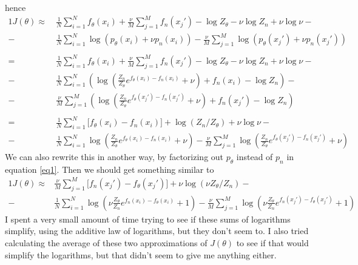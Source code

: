 \documentclass[a4paper]{article}
\begin{document}
hence
\begin{alignat*}{1}
J(\theta) \approx \ &\frac{1}{N} \sum_{i=1}^N  f_\theta(x_i)  + \frac{\nu}{M} \sum_{j=1}^M  f_n(x_j') - \log Z_\theta - \nu \log Z_n + \nu \log \nu-\\
- \ & \frac{1}{N} \sum_{i=1}^N \log( p_\theta(x_i) + \nu p_n(x_i)) - \frac{\nu}{M} \sum_{j=1}^M  \log( p_\theta(x_j') + \nu p_n(x_j')) \\
\\
= \ &\frac{1}{N} \sum_{i=1}^N  f_\theta(x_i)  + \frac{\nu}{M} \sum_{j=1}^M  f_n(x_j') - \log Z_\theta - \nu \log Z_n + \nu \log \nu -\\
- \ & \frac{1}{N} \sum_{i=1}^N \left( \log\left( \frac{Z_n}{Z_\theta} e^{f_\theta(x_i)-f_n(x_i)} + \nu\right) + f_n(x_i) - \log Z_n\right) -\\
- \ & \frac{\nu}{M} \sum_{j=1}^M \left( \log\left( \frac{Z_n}{Z_\theta} e^{f_\theta(x_j')-f_n(x_j')} + \nu\right) + f_n(x_j') - \log Z_n\right)\\
\\
= \ &\frac{1}{N} \sum_{i=1}^N  \big[ f_\theta(x_i) - f_n(x_i)\big]  + \log (Z_n / Z_\theta) + \nu \log \nu -\\
- \ & \frac{1}{N} \sum_{i=1}^N \log\left( \frac{Z_n}{Z_\theta} e^{f_\theta(x_i)-f_n(x_i)} + \nu\right) - \frac{\nu}{M} \sum_{j=1}^M \log\left( \frac{Z_n}{Z_\theta} e^{f_\theta(x_j')-f_n(x_j')} + \nu\right)
\end{alignat*}
We can also rewrite this in another way, by factorizing out $p_\theta$ instead of $p_n$ in equation \eqref{eq1}. Then we should get something similar to
\begin{alignat*}{1}
J(\theta) \approx &\frac{\nu}{M} \sum_{j=1}^M  \big[ f_n(x_j') - f_\theta(x_j')\big]  + \nu \log (\nu Z_\theta / Z_n) -\\
- \ & \frac{1}{N} \sum_{i=1}^N \log\left( \nu \frac{ Z_\theta}{Z_n} e^{f_n(x_i)-f_\theta(x_i)} + 1\right) - \frac{\nu}{M} \sum_{j=1}^M \log\left( \nu\frac{Z_\theta}{Z_n} e^{f_n(x_j')-f_\theta(x_j')} + 1\right)
\end{alignat*}
I spent a very small amount of time trying to see if these sums of logarithms simplify, using the additive law of logarithms, but they don't seem to. I also tried calculating the average of these two approximations of $J(\theta)$ to see if that would simplify the logarithms, but that didn't seem to give me anything either.
\end{document}
